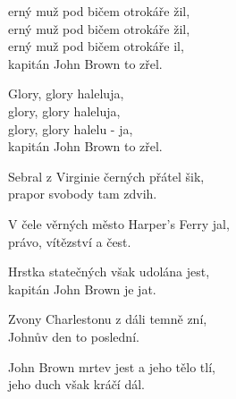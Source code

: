 
\ve{}
erný muž pod bičem otrokáře žil,\\
erný muž pod bičem otrokáře žil,\\
erný muž pod bičem otrokáře il,\\
kapitán John Brown to zřel.

\cho{}
Glory, glory haleluja,\\
glory, glory haleluja,\\
glory, glory halelu - ja,\\
kapitán John Brown to zřel.

\ve{}
Sebral z Virginie černých přátel šik,\\
prapor svobody tam zdvih.

\ve{}
V čele věrných město Harper's Ferry jal,\\
právo, vítězství a čest.

\ve{}
Hrstka statečných však udolána jest,\\
kapitán John Brown je jat.

\ve{}
Zvony Charlestonu z dáli temně zní,\\
Johnův den to poslední.

\ve{}
John Brown mrtev jest a jeho tělo tlí,\\
jeho duch však kráčí dál.

\esong